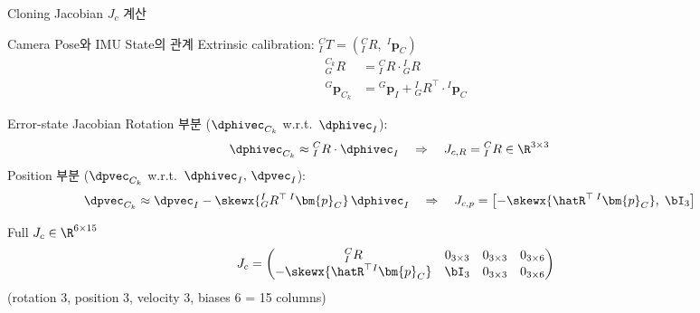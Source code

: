 \begin{frame}[shrink=10]{Cloning Jacobian $J_c$ 계산}
  \begin{block}{Camera Pose와 IMU State의 관계}
    Extrinsic calibration: ${}^C_I T = ({}^C_I R,\; {}^I\bm{p}_C)$
    \begin{align*}
      {}^{C_k}_G R &= {}^C_I R \cdot {}^I_G R \\
      {}^G\bm{p}_{C_k} &= {}^G\bm{p}_I + {}^I_G R^\top \cdot {}^I\bm{p}_C
    \end{align*}
  \end{block}
  \begin{block}{Error-state Jacobian}
    Rotation 부분 ($\dphivec_{C_k}$ w.r.t.\ $\dphivec_I$):
    \begin{align*}
      \dphivec_{C_k} &\approx {}^C_I R \cdot \dphivec_I
      \quad\Rightarrow\quad J_{c,R} = {}^C_I R \in \R^{3\times 3}
    \end{align*}
    Position 부분 ($\dpvec_{C_k}$ w.r.t.\ $\dphivec_I,\, \dpvec_I$):
    \begin{align*}
      \dpvec_{C_k} &\approx \dpvec_I - \skewx{{}^I_G R^\top\, {}^I\bm{p}_C}\,\dphivec_I
      \quad\Rightarrow\quad J_{c,p} = \bigl[-\skewx{\hatR^\top\,{}^I\bm{p}_C},\; \bI_3\bigr]
    \end{align*}
  \end{block}
  \begin{exampleblock}{Full $J_c \in \R^{6\times 15}$}
    \begin{align*}
      J_c = \begin{pmatrix}
        {}^C_I R & 0_{3\times 3} & 0_{3\times 3} & 0_{3\times 6} \\
        -\skewx{\hatR^\top {}^I\bm{p}_C} & \bI_3 & 0_{3\times 3} & 0_{3\times 6}
      \end{pmatrix}
    \end{align*}
    (rotation 3, position 3, velocity 3, biases 6 = 15 columns)
  \end{exampleblock}
\end{frame}

